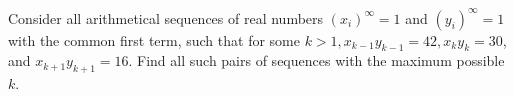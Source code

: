 Consider all arithmetical sequences of real numbers $(x_i)^{\infty}=1$ and $(y_i)^{\infty} =1$ with the common first term, such that for some $k > 1, x_{k-1}y_{k-1} = 42, x_ky_k = 30$, and $x_{k+1}y_{k+1} = 16$. Find all such pairs of sequences with the maximum possible $k$.